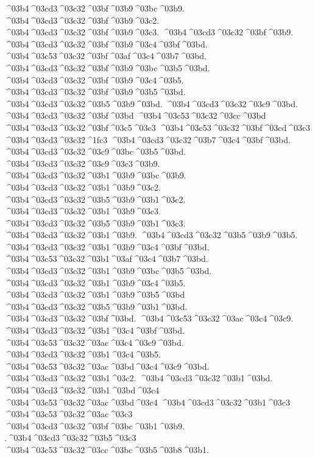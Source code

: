 {	%
	^^^^03b4^^^^03cd3^^^^03c32^^^^03bf^^^^03b9^^^^03bc^^^^03b9.
	^^^^03b4^^^^03cd3^^^^03c32^^^^03bf^^^^03b9^^^^03c2.
	^^^^03b4^^^^03cd3^^^^03c32^^^^03bf^^^^03b9^^^^03c3.
	^^^^03b4^^^^03cd3^^^^03c32^^^^03bf^^^^03b9.
	^^^^03b4^^^^03cd3^^^^03c32^^^^03bf^^^^03b9^^^^03c4^^^^03bf^^^^03bd.
	^^^^03b4^^^^03c53^^^^03c32^^^^03bf^^^^03af^^^^03c4^^^^03b7^^^^03bd.
	^^^^03b4^^^^03cd3^^^^03c32^^^^03bf^^^^03b9^^^^03bc^^^^03b5^^^^03bd.
	^^^^03b4^^^^03cd3^^^^03c32^^^^03bf^^^^03b9^^^^03c4^^^^03b5.
	^^^^03b4^^^^03cd3^^^^03c32^^^^03bf^^^^03b9^^^^03b5^^^^03bd.
	^^^^03b4^^^^03cd3^^^^03c32^^^^03b5^^^^03b9^^^^03bd.
	^^^^03b4^^^^03cd3^^^^03c32^^^^03c9^^^^03bd. ^^^^03b4^^^^03cd3^^^^03c32^^^^03bf^^^^03bd ^^^^03b4^^^^03c53^^^^03c32^^^^03cc^^^^03bd  
	^^^^03b4^^^^03cd3^^^^03c32^^^^03bf^^^^03c5^^^^03c3 ^^^^03b4^^^^03c53^^^^03c32^^^^03bf^^^^03cd^^^^03c3
	^^^^03b4^^^^03cd3^^^^03c32^^^^1fc3
	^^^^03b4^^^^03cd3^^^^03c32^^^^03b7^^^^03c4^^^^03bf^^^^03bd.
	^^^^03b4^^^^03cd3^^^^03c32^^^^03c9^^^^03bc^^^^03b5^^^^03bd.
	^^^^03b4^^^^03cd3^^^^03c32^^^^03c9^^^^03c3^^^^03b9.
	^^^^03b4^^^^03cd3^^^^03c32^^^^03b1^^^^03b9^^^^03bc^^^^03b9.
	^^^^03b4^^^^03cd3^^^^03c32^^^^03b1^^^^03b9^^^^03c2. ^^^^03b4^^^^03cd3^^^^03c32^^^^03b5^^^^03b9^^^^03b1^^^^03c2.
	^^^^03b4^^^^03cd3^^^^03c32^^^^03b1^^^^03b9^^^^03c3. ^^^^03b4^^^^03cd3^^^^03c32^^^^03b5^^^^03b9^^^^03b1^^^^03c3.
	^^^^03b4^^^^03cd3^^^^03c32^^^^03b1^^^^03b9. ^^^^03b4^^^^03cd3^^^^03c32^^^^03b5^^^^03b9^^^^03b5.
	^^^^03b4^^^^03cd3^^^^03c32^^^^03b1^^^^03b9^^^^03c4^^^^03bf^^^^03bd.
	^^^^03b4^^^^03c53^^^^03c32^^^^03b1^^^^03af^^^^03c4^^^^03b7^^^^03bd.
	^^^^03b4^^^^03cd3^^^^03c32^^^^03b1^^^^03b9^^^^03bc^^^^03b5^^^^03bd.
	^^^^03b4^^^^03cd3^^^^03c32^^^^03b1^^^^03b9^^^^03c4^^^^03b5.
	^^^^03b4^^^^03cd3^^^^03c32^^^^03b1^^^^03b9^^^^03b5^^^^03bd ^^^^03b4^^^^03cd3^^^^03c32^^^^03b5^^^^03b9^^^^03b1^^^^03bd.
	^^^^03b4^^^^03cd3^^^^03c32^^^^03bf^^^^03bd.
	^^^^03b4^^^^03c53^^^^03c32^^^^03ac^^^^03c4^^^^03c9.
	^^^^03b4^^^^03cd3^^^^03c32^^^^03b1^^^^03c4^^^^03bf^^^^03bd.
	^^^^03b4^^^^03c53^^^^03c32^^^^03ac^^^^03c4^^^^03c9^^^^03bd.
	^^^^03b4^^^^03cd3^^^^03c32^^^^03b1^^^^03c4^^^^03b5.
	^^^^03b4^^^^03c53^^^^03c32^^^^03ac^^^^03bd^^^^03c4^^^^03c9^^^^03bd.
	^^^^03b4^^^^03cd3^^^^03c32^^^^03b1^^^^03c2. ^^^^03b4^^^^03cd3^^^^03c32^^^^03b1^^^^03bd. ^^^^03b4^^^^03cd3^^^^03c32^^^^03b1^^^^03bd^^^^03c4 ^^^^03b4^^^^03c53^^^^03c32^^^^03ac^^^^03bd^^^^03c4
	^^^^03b4^^^^03cd3^^^^03c32^^^^03b1^^^^03c3 ^^^^03b4^^^^03c53^^^^03c32^^^^03ac^^^^03c3
	^^^^03b4^^^^03cd3^^^^03c32^^^^03bf^^^^03bc^^^^03b1^^^^03b9.
	.^^^^03b4^^^^03cd3^^^^03c32^^^^03b5^^^^03c3
	^^^^03b4^^^^03c53^^^^03c32^^^^03cc^^^^03bc^^^^03b5^^^^03b8^^^^03b1.
}
